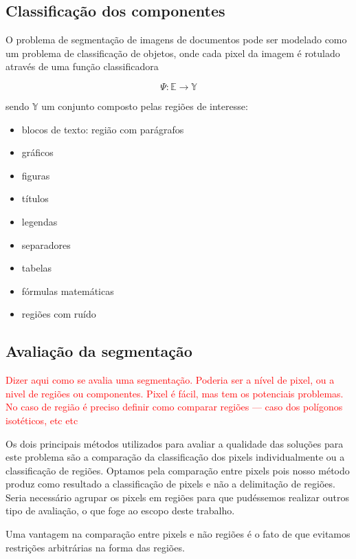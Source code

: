 \documentclass[a4paper,11pt]{article}
\newcommand{\TODO}[1]{\textcolor{red}{#1}}
\begin{document}
\subsection{Classificação dos componentes}
\label{sec:components}

O problema de segmentação de imagens de documentos pode ser modelado como um problema de classificação de objetos, onde cada pixel da imagem é rotulado através de uma função classificadora

\begin{equation}
\Psi \colon \mathbb{E} \rightarrow \mathbb{Y}
\end{equation}

sendo $\mathbb{Y}$ um conjunto composto pelas regiões de interesse:

\begin{itemize}
  \item blocos de texto: região com parágrafos
  \item gráficos
  \item figuras
  \item títulos
  \item legendas
  \item separadores
  \item tabelas
  \item fórmulas matemáticas
  \item regiões com ruído
\end{itemize}

\subsection{Avaliação da segmentação}

\TODO{Dizer aqui como se avalia uma segmentação. Poderia ser a nível
  de pixel, ou a nivel de regiões ou componentes. Pixel é fácil, mas
  tem os potenciais problemas. No caso de região é preciso definir
  como comparar regiões --- caso dos polígonos isotéticos, etc etc}

Os dois principais métodos utilizados para avaliar a qualidade das soluções para este problema são a comparação da classificação dos pixels individualmente ou a classificação de regiões.
Optamos pela comparação entre pixels pois nosso método produz como resultado a classificação de pixels e não a delimitação de regiões. Seria necessário agrupar os pixels em regiões para que pudéssemos realizar outros tipo de avaliação, o que foge ao escopo deste trabalho.

Uma vantagem na comparação entre pixels e não regiões é o fato de que evitamos restrições arbitrárias na forma das regiões.
\end{document}
